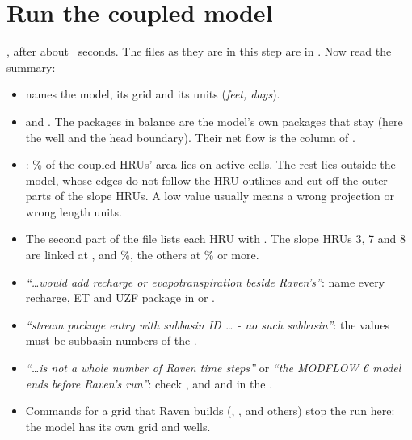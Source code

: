 \section{Run the coupled model}

\label{st:runa}
\see {}, after about ~seconds. The files as they are in this step are in
. Now read the summary:
\begin{tocheck}
\begin{itemize}
\item {} names the model, its grid and its units (\emph{feet, days}).
\item {} and . The packages in balance are the model's own packages that
  stay (here the well and the head boundary). Their net flow is the column  of
  .
\item {}: \% of the coupled HRUs' area lies on active cells. The rest lies outside the
  model, whose edges do not follow the HRU outlines and cut off the outer parts of the slope HRUs. A low value usually
  means a wrong projection or wrong length units.
\item The second part of the file lists each HRU with . The slope HRUs 3, 7 and 8 are
  linked at ,  and \%, the others at \% or more.
\end{itemize}
\end{tocheck}
\begin{trouble}
\begin{itemize}
\item \emph{``\dots would add recharge or evapotranspiration beside Raven's''}: name every recharge, ET and UZF package
  in  or .
\item \emph{``stream package entry with subbasin ID \dots{} - no such subbasin''}: the  values must be
  subbasin numbers of the .
\item \emph{``\dots is not a whole number of Raven time steps''} or \emph{``the MODFLOW 6 model ends before Raven's
  run''}: check , and  and  in the .
\item Commands for a grid that Raven builds (, ,  and others) stop the
  run here: the model has its own grid and wells.
\end{itemize}
\end{trouble}

